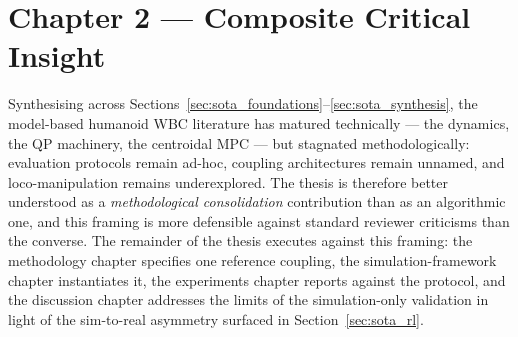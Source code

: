 \section*{Chapter 2 --- Composite Critical Insight}

Synthesising across Sections~\ref{sec:sota_foundations}--\ref{sec:sota_synthesis},
the model-based humanoid WBC literature has matured technically --- the
dynamics, the QP machinery, the centroidal MPC --- but stagnated
methodologically: evaluation protocols remain ad-hoc, coupling
architectures remain unnamed, and loco-manipulation remains
underexplored. The thesis is therefore better understood as a
\emph{methodological consolidation} contribution than as an algorithmic
one, and this framing is more defensible against standard reviewer
criticisms than the converse. The remainder of the thesis executes
against this framing: the methodology chapter specifies one reference
coupling, the simulation-framework chapter instantiates it, the
experiments chapter reports against the protocol, and the discussion
chapter addresses the limits of the simulation-only validation in light
of the sim-to-real asymmetry surfaced in Section~\ref{sec:sota_rl}.
